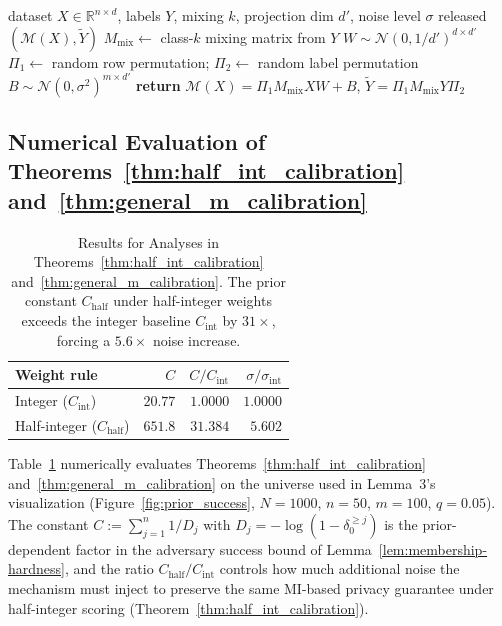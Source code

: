 \documentclass[sigconf,anonymous, review]{acmart}
\begin{document}
\begin{algorithm}[t]
\caption{Obfuscation mechanism $\mathcal{M}$ (per~\cite{xiao2024formal}, made explicit)}
\label{alg:mech}
\begin{algorithmic}[1]
\Require dataset $X\in\mathbb{R}^{n\times d}$, labels $Y$, mixing $k$, projection dim $d'$, noise level $\sigma$
\Ensure  released $(\mathcal{M}(X), \tilde Y)$
\State $M_{\mathrm{mix}} \gets$ class-$k$ mixing matrix from $Y$ 
\State $W \sim \mathcal{N}(0, 1/d')^{d\times d'}$ 
\State $\Pi_1 \gets$ random row permutation;\; $\Pi_2 \gets$ random label permutation
\State $B \sim \mathcal{N}(0,\sigma^2)^{m\times d'}$ 
\State \textbf{return} $\mathcal{M}(X) = \Pi_1 M_{\mathrm{mix}} X W + B$,\;\; $\tilde Y = \Pi_1 M_{\mathrm{mix}} Y \Pi_2$
\end{algorithmic}
\end{algorithm}

\subsection{Numerical Evaluation of Theorems~\ref{thm:half_int_calibration} and~\ref{thm:general_m_calibration}}
\label{subsec:numerical_validation}

\begin{table}[!htbp]
\centering\small
\caption{Results for Analyses in Theorems~\ref{thm:half_int_calibration} and~\ref{thm:general_m_calibration}. The prior constant $C_{\mathrm{half}}$ under half-integer weights exceeds the integer baseline $C_{\mathrm{int}}$ by $31\times$, forcing a $5.6\times$ noise increase.}
\label{tab:calibration}
\begin{tabular}{lrrr}
\toprule
Weight rule & $C$ & $C/C_{\mathrm{int}}$ & $\sigma/\sigma_{\mathrm{int}}$ \\
\midrule
Integer ($C_{\mathrm{int}}$)      & $20.77$  & $1.0000$  & $1.0000$ \\
Half-integer ($C_{\mathrm{half}}$) & $651.8$  & $31.384$  & $5.602$ \\
\bottomrule
\end{tabular}
\end{table}

Table~\ref{tab:calibration} numerically evaluates Theorems~\ref{thm:half_int_calibration} and~\ref{thm:general_m_calibration} on the universe used in Lemma~3's visualization (Figure~\ref{fig:prior_success}, $N = 1000$, $n = 50$, $m = 100$, $q = 0.05$). The constant $C := \sum_{j=1}^n 1/D_j$ with $D_j = -\log(1 - \delta_0^{\ge j})$ is the prior-dependent factor in the adversary success bound of Lemma~\ref{lem:membership-hardness}, and the ratio $C_{\mathrm{half}}/C_{\mathrm{int}}$ controls how much additional noise the mechanism must inject to preserve the same MI-based privacy guarantee under half-integer scoring (Theorem~\ref{thm:half_int_calibration}).
\end{document}
